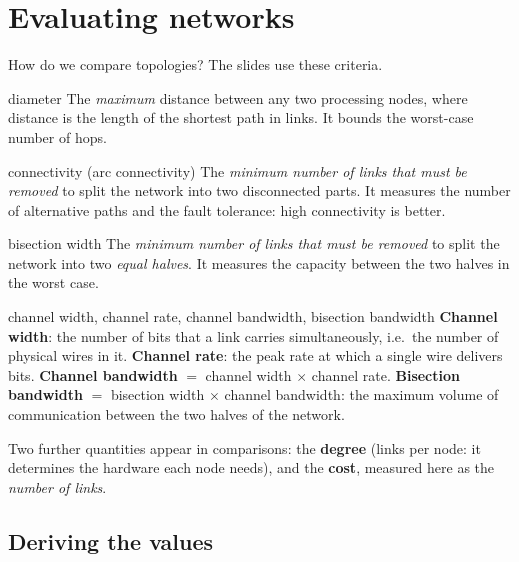 \section{Evaluating networks}

How do we compare topologies? The slides use these criteria.

\begin{definition}{diameter}
The \emph{maximum} distance between any two processing nodes, where distance is the length of the shortest path in links. It bounds the worst-case number
of hops.
\end{definition}

\begin{definition}{connectivity (arc connectivity)}
The \emph{minimum number of links that must be removed} to split the network into two disconnected parts. It measures the number of alternative paths
and the fault tolerance: high connectivity is better.
\end{definition}

\begin{definition}{bisection width}
The \emph{minimum number of links that must be removed} to split the network into two \emph{equal halves}. It measures the
capacity between the two halves in the worst case.
\end{definition}

\begin{definition}{channel width, channel rate, channel bandwidth, bisection bandwidth}
\textbf{Channel width}: the number of bits that a link carries simultaneously, i.e.\ the number of physical wires in it.
\textbf{Channel rate}: the peak rate at which a single wire delivers bits.
\textbf{Channel bandwidth} $=$ channel width $\times$ channel rate.
\textbf{Bisection bandwidth} $=$ bisection width $\times$ channel bandwidth: the maximum volume of communication between the two halves of the network.
\end{definition}

Two further quantities appear in comparisons: the \textbf{degree} (links per node: it determines the hardware each node needs), and the
\textbf{cost}, measured here as the \emph{number of links}.

\subsection{Deriving the values}

